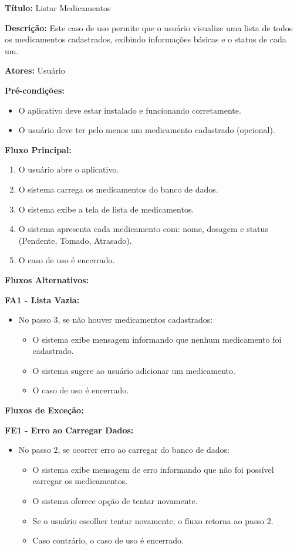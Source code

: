 \documentclass[12pt]{article}
\begin{document}
\textbf{Título:} Listar Medicamentos

\textbf{Descrição:} Este caso de uso permite que o usuário visualize uma lista de todos os medicamentos cadastrados, exibindo informações básicas e o status de cada um.

\textbf{Atores:} Usuário

\textbf{Pré-condições:}
\begin{itemize}
    \item O aplicativo deve estar instalado e funcionando corretamente.
    \item O usuário deve ter pelo menos um medicamento cadastrado (opcional).
\end{itemize}

\textbf{Fluxo Principal:}
\begin{enumerate}
    \item O usuário abre o aplicativo.
    \item O sistema carrega os medicamentos do banco de dados.
    \item O sistema exibe a tela de lista de medicamentos.
    \item O sistema apresenta cada medicamento com: nome, dosagem e status (Pendente, Tomado, Atrasado).
    \item O caso de uso é encerrado.
\end{enumerate}

\textbf{Fluxos Alternativos:}

\textbf{FA1 - Lista Vazia:}
\begin{itemize}
    \item No passo 3, se não houver medicamentos cadastrados:
    \begin{itemize}
        \item O sistema exibe mensagem informando que nenhum medicamento foi cadastrado.
        \item O sistema sugere ao usuário adicionar um medicamento.
        \item O caso de uso é encerrado.
    \end{itemize}
\end{itemize}

\textbf{Fluxos de Exceção:}

\textbf{FE1 - Erro ao Carregar Dados:}
\begin{itemize}
    \item No passo 2, se ocorrer erro ao carregar do banco de dados:
    \begin{itemize}
        \item O sistema exibe mensagem de erro informando que não foi possível carregar os medicamentos.
        \item O sistema oferece opção de tentar novamente.
        \item Se o usuário escolher tentar novamente, o fluxo retorna ao passo 2.
        \item Caso contrário, o caso de uso é encerrado.
    \end{itemize}
\end{itemize}
\end{document}
